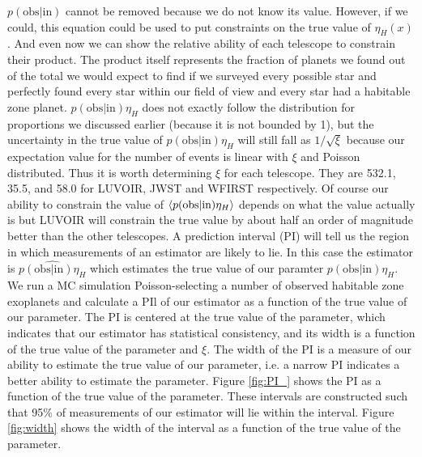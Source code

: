 \documentclass{article}
\begin{document}
 $p(\mbox{obs}|\mbox{in})$ cannot be removed because we do not know its value. However,  if we could, this equation could be used to put constraints on the true value of $\eta_H(x)$. And even now we can show the relative ability of each telescope to constrain their product. The product itself represents the fraction of planets we found out of the total we would expect to find if we surveyed every possible star and perfectly found every star within our field of view and every star had a habitable zone planet. $p(\mbox{obs}|\mbox{in}) \eta_H$ does not exactly follow the distribution for proportions we discussed earlier (because it is not bounded by 1), but the uncertainty in the true value of $p(\mbox{obs}|\mbox{in}) \eta_H$ will still fall as $1/\sqrt{\xi}$ because our expectation value for the number of events is linear with $\xi$ and Poisson distributed. Thus it is worth determining $\xi$ for each telescope. They are 532.1, 35.5, and 58.0 for LUVOIR, JWST and WFIRST respectively. Of course our ability to constrain the value of $\braket{p(\mbox{obs}|\mbox{in}) \eta_H}$ depends on what the value actually is but LUVOIR will constrain the true value by about half an order of magnitude better than the other telescopes.
	A prediction interval (PI) will tell us the region in which measurements of an estimator are likely to lie. In this case the estimator is  $\widehat{p(\mbox{obs}|\mbox{in}) \eta_H}$ which estimates the true value of our paramter $p(\mbox{obs}|\mbox{in}) \eta_H$. We run a MC simulation Poisson-selecting a number of observed habitable zone exoplanets and calculate a PIl of our estimator as a function of the true value of our parameter. The PI is centered at the true value of the parameter, which indicates that our estimator has statistical consistency, and its width is a function of the true value of the parameter and $\xi$. The width of the PI is a measure of our ability to estimate the true value of our parameter, i.e. a narrow PI indicates a better ability to estimate the parameter. Figure \ref{fig:PI_} shows the PI as a function of the true value of the parameter. These intervals are constructed such that 95\% of measurements of our estimator will lie within the interval. Figure \ref{fig:width} shows the width of the interval as a function of the true value of the parameter.
	
\end{document}
